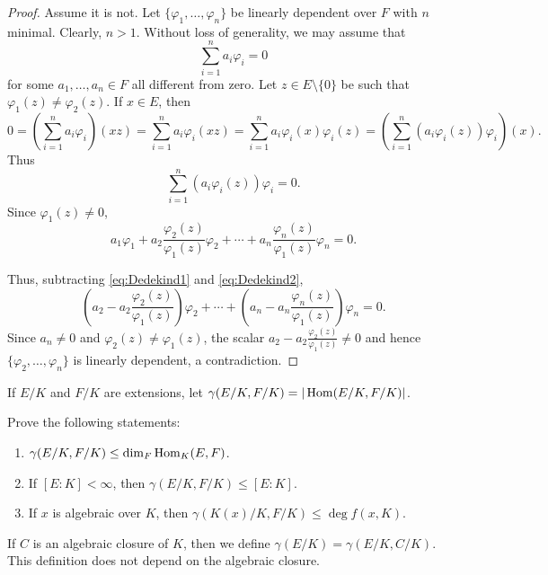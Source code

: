 \begin{proof}
    Assume it is not. Let $\{\varphi_1,\dots,\varphi_n\}$ 
    be linearly dependent over $F$ with $n$ minimal. Clearly, $n>1$. 
    Without loss of generality, we may assume that 
    \begin{equation}
        \label{eq:Dedekind1}
        \sum_{i=1}^n a_i\varphi_i=0
    \end{equation}
    for some $a_1,\dots,a_n\in F$ all different from zero. 
    Let
    $z\in E\setminus\{0\}$ be such that $\varphi_1(z)\ne\varphi_2(z)$. If $x\in E$, then
    \[
    0=\left(\sum_{i=1}^na_i\varphi_i\right)(xz)=\sum_{i=1}^na_i\varphi_i(xz)
    =\sum_{i=1}^na_i\varphi_i(x)\varphi_i(z)
    =\left(\sum_{i=1}^n (a_i\varphi_i(z))\varphi_i\right)(x).
    \]
    Thus 
    \[
        \sum_{i=1}^n (a_i\varphi_i(z))\varphi_i=0.
    \]
    Since $\varphi_1(z)\ne0$, 
    \begin{equation}
    \label{eq:Dedekind2}
        a_1\varphi_1+a_2\frac{\varphi_2(z)}{\varphi_1(z)}\varphi_2+\cdots+a_n\frac{\varphi_n(z)}{\varphi_1(z)}\varphi_n=0.
    \end{equation}

    Thus, 
    subtracting \eqref{eq:Dedekind1} and \eqref{eq:Dedekind2}, 
    \[
    \left(a_2-a_2\frac{\varphi_2(z)}{\varphi_1(z)}\right)\varphi_2
    +\cdots+\left(a_n-a_n\frac{\varphi_n(z)}{\varphi_1(z)}\right)\varphi_n=0.
    \]
    Since $a_n\ne 0$ and $\varphi_2(z)\ne\varphi_1(z)$, 
    the scalar $a_2-a_2\frac{\varphi_2(z)}{\varphi_1(z)}\ne 0$ and hence 
    $\{\varphi_2,\dots,\varphi_n\}$ is linearly dependent, a contradiction. 
\end{proof}

If $E/K$ and $F/K$ are extensions, 
let $\gamma(E/K,F/K)=|\operatorname{Hom}(E/K,F/K)|$. 

\begin{exercise}
Prove the following statements:
\begin{enumerate}
    \item $\gamma(E/K,F/K)\leq\dim_F\operatorname{Hom}_K(E,F)$.
    \item If $[E:K]<\infty$, then $\gamma(E/K,F/K)\leq[E:K]$. 
    \item If $x$ is algebraic over $K$, then $\gamma(K(x)/K,F/K)\leq\deg f(x,K)$.
\end{enumerate}
\end{exercise}

If $C$ is an algebraic closure of $K$,
then we define $\gamma(E/K)=\gamma(E/K,C/K)$. This definition does
not depend on the algebraic closure. 

